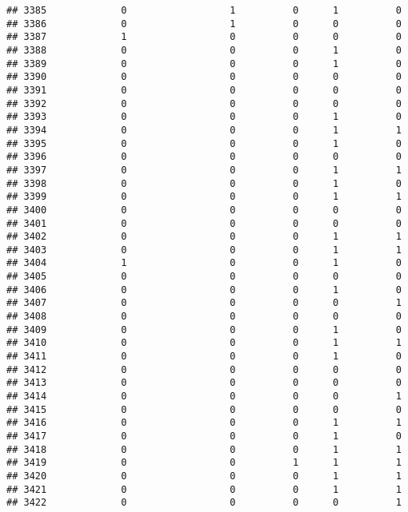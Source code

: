 \documentclass[
]{article}
\begin{document}
\begin{verbatim}
## 3385             0                  1          0      1          0
## 3386             0                  1          0      0          0
## 3387             1                  0          0      0          0
## 3388             0                  0          0      1          0
## 3389             0                  0          0      1          0
## 3390             0                  0          0      0          0
## 3391             0                  0          0      0          0
## 3392             0                  0          0      0          0
## 3393             0                  0          0      1          0
## 3394             0                  0          0      1          1
## 3395             0                  0          0      1          0
## 3396             0                  0          0      0          0
## 3397             0                  0          0      1          1
## 3398             0                  0          0      1          0
## 3399             0                  0          0      1          1
## 3400             0                  0          0      0          0
## 3401             0                  0          0      0          0
## 3402             0                  0          0      1          1
## 3403             0                  0          0      1          1
## 3404             1                  0          0      1          0
## 3405             0                  0          0      0          0
## 3406             0                  0          0      1          0
## 3407             0                  0          0      0          1
## 3408             0                  0          0      0          0
## 3409             0                  0          0      1          0
## 3410             0                  0          0      1          1
## 3411             0                  0          0      1          0
## 3412             0                  0          0      0          0
## 3413             0                  0          0      0          0
## 3414             0                  0          0      0          1
## 3415             0                  0          0      0          0
## 3416             0                  0          0      1          1
## 3417             0                  0          0      1          0
## 3418             0                  0          0      1          1
## 3419             0                  0          1      1          1
## 3420             0                  0          0      1          1
## 3421             0                  0          0      1          1
## 3422             0                  0          0      0          1

\end{verbatim}
\end{document}
